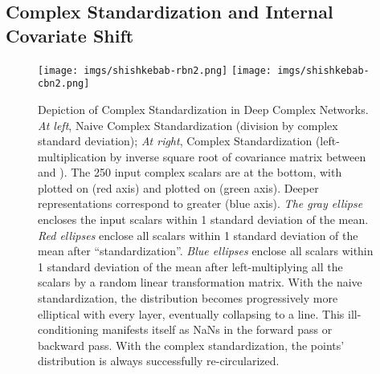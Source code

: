 \documentclass{article}
\begin{document}
\subsection{Complex Standardization and Internal Covariate Shift}\label{covariateshift}
\begin{figure}[h]
\centering
\texttt{[image: imgs/shishkebab-rbn2.png]}
\texttt{[image: imgs/shishkebab-cbn2.png]}
	\caption{Depiction of Complex Standardization in Deep Complex Networks. \textit{At left}, Naive Complex Standardization (division by complex standard deviation); \textit{At right}, Complex Standardization (left-multiplication by inverse square root of covariance matrix between  and ). The 250 input complex scalars are at the bottom, with  plotted on  (red axis) and  plotted on  (green axis). Deeper representations correspond to greater  (blue axis). \textit{The gray ellipse} encloses the input scalars within 1 standard deviation of the mean. \textit{Red ellipses} enclose all scalars within 1 standard deviation of the mean after ``standardization''. \textit{Blue ellipses} enclose all scalars within 1 standard deviation of the mean after left-multiplying all the scalars by a random  linear transformation matrix. With the naive standardization, the distribution becomes progressively more elliptical with every layer, eventually collapsing to a line. This ill-conditioning manifests itself as NaNs in the forward pass or backward pass. With the complex standardization, the points' distribution is always successfully re-circularized.}
\end{figure}

\newpage
\end{document}
